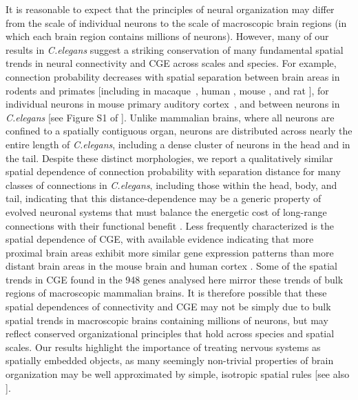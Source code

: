 {It is reasonable to expect that the principles of neural organization may differ from the scale of individual neurons to the scale of macroscopic brain regions (in which each brain region contains millions of neurons).
However, many of our results in \emph{C.elegans} suggest a striking conservation of many fundamental spatial trends in neural connectivity and CGE across scales and species.
For example, connection probability decreases with spatial separation between brain areas in rodents and primates \citep{Horvat2016,Wang2016} [including in \mbox{macaque \citep{Markov2013}}, human \citep{Henderson2014}, mouse \citep{Fulcher2016}, and rat \mbox{\citep{Noori2017}}],
for individual neurons in mouse primary auditory \mbox{cortex \citep{Levy2012}},
and between neurons in \emph{C.elegans} [see Figure S1 of \citep{Azulay2016}].
Unlike mammalian brains, where all neurons are confined to a spatially contiguous organ, neurons are distributed across nearly the entire length of \emph{C.elegans}, including a dense cluster of neurons in the head and in the tail.
Despite these distinct morphologies, we report a qualitatively similar spatial dependence of connection probability with separation distance for many classes of connections in \emph{C.elegans}, including those within the head, body, and tail, indicating that this distance-dependence may be a generic property of evolved neuronal systems that must balance the energetic cost of long-range connections with their functional benefit \citep{Bullmore2012, VandenHeuvel2012, Kim2014a, Betzel2016}.
Less frequently characterized is the spatial dependence of CGE, with available evidence indicating that more proximal brain areas exhibit more similar gene expression patterns than more distant brain areas in the mouse brain \citep{Fulcher2016} and human cortex \citep{Krienen2016, Pantazatos2017, Richiardi2017}.
Some of the spatial trends in CGE found in the 948 genes analysed here mirror these trends of bulk regions of macroscopic mammalian brains.
It is therefore possible that these spatial dependences of connectivity and CGE may not be simply due to bulk spatial trends in macroscopic brains containing millions of neurons, but may reflect conserved organizational principles that hold across species and spatial scales.
Our results highlight the importance of treating nervous systems as spatially embedded objects, as many seemingly non-trivial properties of brain organization may be well approximated by simple, isotropic spatial rules \citep{Henderson2014, Roberts2016, Horvat2016, Bassett2010, Chen2006} [see also \citep{Bullmore2012, Betzel2016}].

}
